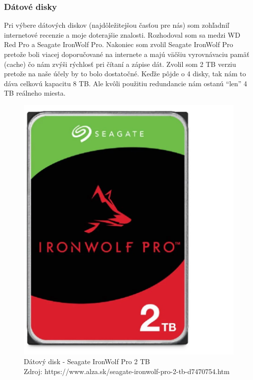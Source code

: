 \documentclass[12pt,oneside,slovak,a4paper]{article}
\begin{document}
\subsubsection{Dátové disky}
Pri výbere dátových diskov (najdôležitejšou časťou pre nás) som zohľadniľ internetové recenzie a moje doterajšie znalosti. Rozhodoval som sa medzi WD Red Pro a Seagate IronWolf Pro. Nakoniec som zvolil Seagate IronWolf Pro pretože boli viacej doporučované na internete a majú väčšiu vyrovnávaciu pamäť (cache) čo nám zvýši rýchlosť pri čítaní a zápise dát. Zvolil som 2 TB verziu pretože na naše účely by to bolo dostatočné. Keďže pôjde o 4 disky, tak nám to dáva celkovú kapacitu 8 TB. Ale kvôli použitiu redundancie nám ostanú ``len'' 4 TB reálneho miesta.

\begin{figure}[H]
	\centering
	\captionsetup{justification=centering,margin=2cm}
	\includegraphics[scale=0.2]{./images/data-drive.png} %
	\centering
	\caption{Dátový disk - Seagate IronWolf Pro 2 TB \\ Zdroj: https://www.alza.sk/seagate-ironwolf-pro-2-tb-d7470754.htm}
\end{figure}
\end{document}
